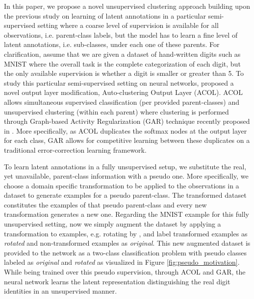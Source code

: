 \documentclass{article} \usepackage{iclr2018_conference,times}
\begin{document}
In this paper, we propose a novel unsupervised clustering approach building upon the previous study on learning of latent annotations in a particular semi-supervised setting where a coarse level of supervision is available for all observations, i.e. parent-class labels, but the model has to learn a fine level of latent annotations, i.e. sub-classes, under each one of these parents. For clarification, assume that we are given a dataset of hand-written digits such as MNIST \citep{lecun1998mnist} where the overall task is the complete categorization of each digit, but the only available supervision is whether a digit is smaller or greater than 5. To study this particular semi-supervised setting on neural networks, \citet{KilincU17ACOL} proposed a novel output layer modification, Auto-clustering Output Layer (ACOL). ACOL allows simultaneous supervised classification (per provided parent-classes) and unsupervised clustering (within each parent) where clustering is performed through Graph-based Activity Regularization (GAR) technique recently proposed in \citet{KilincU17GAR}. More specifically, as ACOL duplicates the softmax nodes at the output layer for each class, GAR allows for competitive learning between these duplicates on a traditional error-correction learning framework. 

To learn latent annotations in a fully unsupervised setup, we substitute the real, yet unavailable, parent-class information with a pseudo one. More specifically, we choose a domain specific transformation to be applied to the observations in a dataset to generate examples for a pseudo parent-class. The transformed dataset constitutes the examples of that pseudo parent-class and every new transformation generates a new one. Regarding the MNIST example for this fully unsupervised setting, now we simply augment the dataset by applying a transformation to examples, e.g. rotating by , and label transformed examples as \textit{rotated} and non-transformed examples as \textit{original}. This new augmented dataset is provided to the network as a two-class classification problem with pseudo classes labeled as \textit{original} and \textit{rotated} as visualized in Figure \ref{fig:pseudo_motivation}. While being trained over this pseudo supervision, through ACOL and GAR, the neural network learns the latent representation distinguishing the real digit identities in an unsupervised manner.
\end{document}
